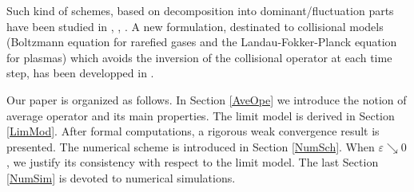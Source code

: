 \documentclass[12pt, a4paper]{article}
\newcommand{\eps}[0]{
\varepsilon}
\begin{document}
Such kind of schemes, based on decomposition into dominant/fluctuation parts have been studied in \cite{BenLemMie08}, \cite{LemMie08}, \cite{CroLem11}. A new formulation, destinated to collisional models (Boltzmann equation for rarefied gases and the Landau-Fokker-Planck equation for plasmas) which avoids the inversion of the collisional operator at each time step, has been developped in \cite{Lem10}.

Our paper is organized as follows. In Section \ref{AveOpe} we introduce the notion of average operator and its main properties. The limit model is derived in Section \ref{LimMod}. After formal computations, a rigorous weak convergence result is presented. The numerical scheme is introduced in Section \ref{NumSch}. When $\eps \searrow 0$, we justify its consistency with respect to the limit model. The last Section \ref{NumSim} is devoted to numerical simulations. 
\end{document}
